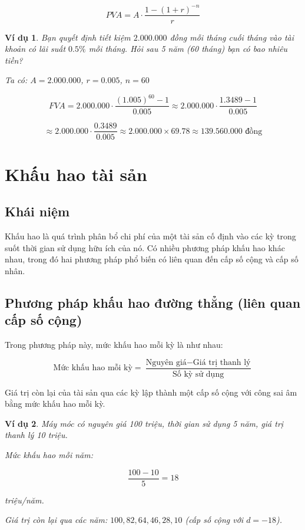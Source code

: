 \documentclass[12pt,a4paper]{report}
\newtheorem{example}{Ví dụ}[section]
\begin{document}
\[
    PVA = A \cdot \frac{1 - (1 + r)^{-n}}{r}
\]

\begin{example}
    Bạn quyết định tiết kiệm $2.000.000$ đồng mỗi tháng cuối tháng vào tài khoản có lãi suất $0.5\%$ mỗi tháng. Hỏi sau 5 năm (60 tháng) bạn có bao nhiêu tiền?
    
    Ta có:
    $A = 2.000.000$,
    $r = 0.005$,
    $n = 60$
    
    \[
        FVA
        = 2.000.000 \cdot
        \frac{(1.005)^{60} - 1}{0.005}
        \approx
        2.000.000 \cdot
        \frac{1.3489 - 1}{0.005}
    \]
    
    \[
        \approx
        2.000.000 \cdot
        \frac{0.3489}{0.005}
        \approx
        2.000.000 \times 69.78
        \approx
        139.560.000 \text{ đồng}
    \]
\end{example}

\section{Khấu hao tài sản}

\subsection{Khái niệm}

Khấu hao là quá trình phân bổ chi phí của một tài sản cố định vào các kỳ trong suốt thời gian sử dụng hữu ích của nó. Có nhiều phương pháp khấu hao khác nhau, trong đó hai phương pháp phổ biến có liên quan đến cấp số cộng và cấp số nhân.

\subsection{Phương pháp khấu hao đường thẳng (liên quan cấp số cộng)}

Trong phương pháp này, mức khấu hao mỗi kỳ là như nhau:

\[
    \text{Mức khấu hao mỗi kỳ}
    =
    \frac{\text{Nguyên giá} - \text{Giá trị thanh lý}}
    {\text{Số kỳ sử dụng}}
\]

Giá trị còn lại của tài sản qua các kỳ lập thành một cấp số cộng với công sai âm bằng mức khấu hao mỗi kỳ.

\begin{example}
    Máy móc có nguyên giá 100 triệu, thời gian sử dụng 5 năm, giá trị thanh lý 10 triệu.
    
    Mức khấu hao mỗi năm:
    
    \[
        \frac{100 - 10}{5} = 18
    \]
    
    triệu/năm.
    
    Giá trị còn lại qua các năm:
    $100, 82, 64, 46, 28, 10$
    (cấp số cộng với $d = -18$).
\end{example}
\end{document}
